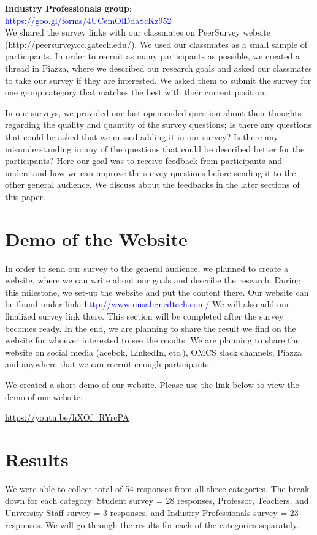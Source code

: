 \documentclass{sigchi}
\begin{document}
\textbf{Industry Professionals group}:\\  \textcolor{blue}{https://goo.gl/forms/4UCemOlDdaScKz952}\\

We shared the survey links with our classmates on PeerSurvey website (http://peersurvey.cc.gatech.edu/). We used our classmates as a small sample of participants. In order to recruit as many participants as possible, we created a thread in Piazza, where we described our research goals and asked our classmates to take our survey if they are interested. We asked them to submit the survey for one group category that matches the best with their current position. 

In our surveys, we provided one last open-ended question about their thoughts regarding the quality and quantity of the survey questions; Is there any questions that could be asked that we missed adding it in our survey? Is there any misunderstanding in any of the questions that could be described better for the participants? Here our goal was to receive feedback from participants and understand how we can improve the survey questions before sending it to the other general audience. We discuss about the feedbacks in the later sections of this paper.

\section{Demo of the Website}
In order to send our survey to the general audience, we planned to create a website, where we can write about our goals and describe the research. During this milestone, we set-up the website and put the content there. Our website can be found under link: \textcolor{blue}{http://www.misalignedtech.com/}
We will also add our finalized survey link there. This section will be completed after the survey becomes ready. In the end, we are planning to share the result we find on the website for whoever interested to see the results. We are planning to share the website on social media (acebok, LinkedIn, etc.), OMCS slack channels, Piazza and anywhere that we can recruit enough participants.

We created a short demo of our website. Please use the link below to view the demo of our website:

\url{https://youtu.be/hXOf_RYrcPA}


\section{Results}
We were able to collect total of 54 responses from all three categories. The break down for each category: Student survey = 28 responses, Professor, Teachers, and University Staff survey = 3 responses, and Industry Professionals survey = 23 responses.
We will go through the results for each of the categories separately.
\end{document}
